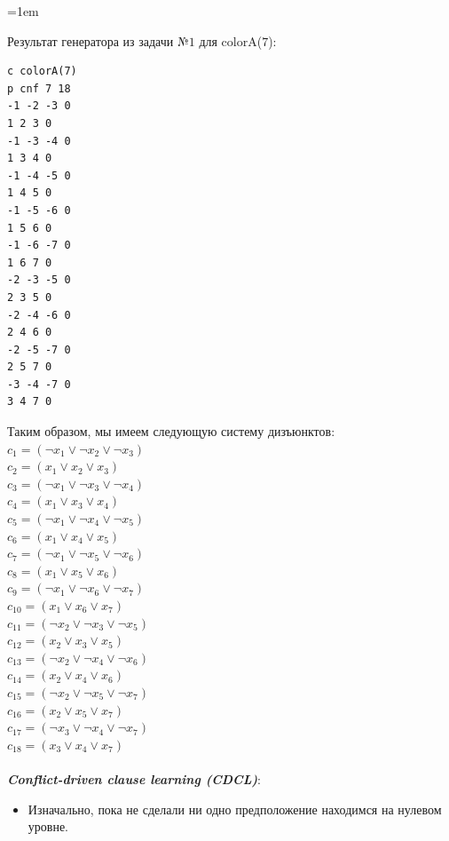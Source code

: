 \documentclass[12pt]{extreport}
\theoremstyle{definiton}
\theoremstyle{definition}
\theoremstyle{definition}
\newcommand{\solution}[2][\color{myblue}Решение]{
\medskip
	\noindent{\bfseries #1 }{{\color{myblue}\bfseries #2:}}
}
\newenvironment{blockquote}{%
  \par%
  \medskip
  \leftskip=1em%
  \noindent}{%
  \par\medskip}
\begin{document}
\solution{3}
\begin{blockquote}
{\color{myblue}
\noindent Результат генератора из задачи №$1$ для colorA($7$):\\
\begin{lstlisting}
c colorA(7)
p cnf 7 18
-1 -2 -3 0
1 2 3 0
-1 -3 -4 0
1 3 4 0
-1 -4 -5 0
1 4 5 0
-1 -5 -6 0
1 5 6 0
-1 -6 -7 0
1 6 7 0
-2 -3 -5 0
2 3 5 0
-2 -4 -6 0
2 4 6 0
-2 -5 -7 0
2 5 7 0
-3 -4 -7 0
3 4 7 0
\end{lstlisting}
Таким образом, мы имеем следующую систему дизъюнктов:\\
$c_1 = (\neg x_1 \vee \neg x_2 \vee \neg x_3)$\\ %
$c_2 = (x_1 \vee x_2 \vee x_3)$\\ %
$c_3 = (\neg x_1 \vee \neg x_3 \vee \neg x_4)$\\ %
$c_4 = (x_1 \vee x_3 \vee x_4)$\\ %
$c_5 = (\neg x_1 \vee \neg x_4 \vee \neg x_5)$\\ %
$c_6 = (x_1 \vee x_4 \vee x_5)$\\ %
$c_7 = (\neg x_1 \vee \neg x_5 \vee \neg x_6)$\\ %
$c_8 = (x_1 \vee x_5 \vee x_6)$\\ %
$c_9 = (\neg x_1 \vee \neg x_6 \vee \neg x_7)$\\ %
$c_{10} = (x_1 \vee x_6 \vee x_7)$\\ %
$c_{11} = (\neg x_2 \vee \neg x_3 \vee \neg x_5)$\\ %
$c_{12} = (x_2 \vee x_3 \vee x_5)$\\ %
$c_{13} = (\neg x_2 \vee \neg x_4 \vee \neg x_6)$\\ %
$c_{14} = (x_2 \vee x_4 \vee x_6)$\\ %
$c_{15} = (\neg x_2 \vee \neg x_5 \vee \neg x_7)$\\ %
$c_{16} = (x_2 \vee x_5 \vee x_7)$\\ %
$c_{17} = (\neg x_3 \vee \neg x_4 \vee \neg x_7)$\\ %
$c_{18} = (x_3 \vee x_4 \vee x_7)$\\ %
\\
\textbf{\textit{Conflict-driven clause learning (CDCL)}}:
\begin{itemize}
    \item Изначально, пока не сделали ни одно предположение находимся на нулевом уровне.

\end{itemize}}
\end{blockquote}
\end{document}
